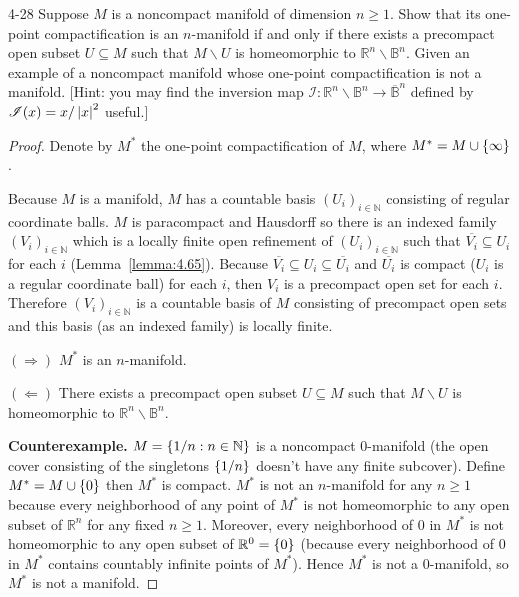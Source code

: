 \begin{problem}{4-28}
Suppose $M$ is a noncompact manifold of dimension $n\geq 1$. Show that its one-point compactification is an $n$-manifold if and only if there exists a precompact open subset $U \subseteq M$ such that $M\smallsetminus U$ is homeomorphic to $\mathbb{R}^{n} \smallsetminus \mathbb{B}^{n}$. Given an example of a noncompact manifold whose one-point compactification is not a manifold. [Hint: you may find the inversion map $\mathscr{I}: \mathbb{R}^{n} \smallsetminus \mathbb{B}^{n} \to \overline{\mathbb{B}}^{n}$ defined by $\mathscr{I}(x) = x/\left\vert{x}\right\vert^{2}$ useful.]
\end{problem}


\begin{proof}
	Denote by $M^{*}$ the one-point compactification of $M$, where $M^{*} = M \cup \left\{{\infty}\right\}$.

	Because $M$ is a manifold, $M$ has a countable basis ${(U_{i})}_{i\in\mathbb{N}}$ consisting of regular coordinate balls. $M$ is paracompact and Hausdorff so there is an indexed family ${(V_{i})}_{i\in\mathbb{N}}$ which is a locally finite open refinement of ${(U_{i})}_{i\in\mathbb{N}}$ such that $\overline{V_{i}} \subseteq U_{i}$ for each $i$ (Lemma~\ref{lemma:4.65}). Because $\overline{V_{i}} \subseteq U_{i} \subseteq \overline{U_{i}}$ and $\overline{U_{i}}$ is compact ($U_{i}$ is a regular coordinate ball) for each $i$, then $V_{i}$ is a precompact open set for each $i$. Therefore ${(V_{i})}_{i\in\mathbb{N}}$ is a countable basis of $M$ consisting of precompact open sets and this basis (as an indexed family) is locally finite.

	$(\Longrightarrow)$ $M^{*}$ is an $n$-manifold.

	$(\Longleftarrow)$ There exists a precompact open subset $U\subseteq M$ such that $M\smallsetminus U$ is homeomorphic to $\mathbb{R}^{n}\smallsetminus\mathbb{B}^{n}$.

	\textbf{Counterexample.} $M = \left\{{1/n : n\in\mathbb{N}}\right\}$ is a noncompact 0-manifold (the open cover consisting of the singletons $\left\{{1/n}\right\}$ doesn't have any finite subcover). Define $M^{*} = M \cup \left\{{0}\right\}$ then $M^{*}$ is compact. $M^{*}$ is not an $n$-manifold for any $n \geq 1$ because every neighborhood of any point of $M^{*}$ is not homeomorphic to any open subset of $\mathbb{R}^{n}$ for any fixed $n\geq 1$. Moreover, every neighborhood of 0 in $M^{*}$ is not homeomorphic to any open subset of $\mathbb{R}^{0} = \left\{{0}\right\}$ (because every neighborhood of 0 in $M^{*}$ contains countably infinite points of $M^{*}$). Hence $M^{*}$ is not a 0-manifold, so $M^{*}$ is not a manifold.
\end{proof}


